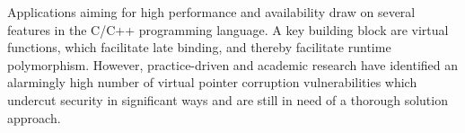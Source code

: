 
% 


Applications aiming for high performance and availability draw on several features in the C/C++ programming language. 
A key building block are virtual functions, which facilitate late binding, and thereby facilitate runtime polymorphism. 
However, practice-driven and academic research have identified an alarmingly high number of virtual pointer corruption 
vulnerabilities which undercut security in significant ways and are still in need of a thorough solution approach.

